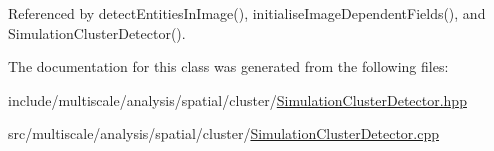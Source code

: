 Referenced by detect\-Entities\-In\-Image(), initialise\-Image\-Dependent\-Fields(), and Simulation\-Cluster\-Detector().



The documentation for this class was generated from the following files\-:\begin{DoxyCompactItemize}
\item 
include/multiscale/analysis/spatial/cluster/\hyperlink{SimulationClusterDetector_8hpp}{Simulation\-Cluster\-Detector.\-hpp}\item 
src/multiscale/analysis/spatial/cluster/\hyperlink{SimulationClusterDetector_8cpp}{Simulation\-Cluster\-Detector.\-cpp}\end{DoxyCompactItemize}
